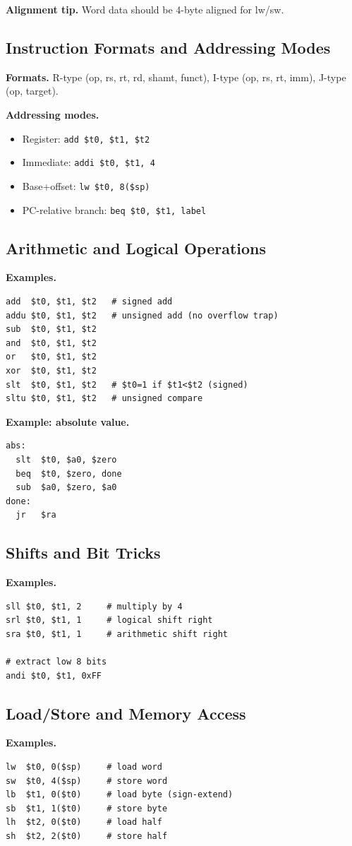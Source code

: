 \documentclass[11pt]{article}
\begin{document}
\textbf{Alignment tip.} Word data should be 4-byte aligned for lw/sw.

\subsection{Instruction Formats and Addressing Modes}
\textbf{Formats.} R-type (op, rs, rt, rd, shamt, funct), I-type (op, rs, rt, imm), J-type (op, target).

\textbf{Addressing modes.}
\begin{itemize}[leftmargin=*]
  \item Register: \texttt{add \$t0, \$t1, \$t2}
  \item Immediate: \texttt{addi \$t0, \$t1, 4}
  \item Base+offset: \texttt{lw \$t0, 8(\$sp)}
  \item PC-relative branch: \texttt{beq \$t0, \$t1, label}
\end{itemize}

\subsection{Arithmetic and Logical Operations}
\textbf{Examples.}
\begin{verbatim}
add  $t0, $t1, $t2   # signed add
addu $t0, $t1, $t2   # unsigned add (no overflow trap)
sub  $t0, $t1, $t2
and  $t0, $t1, $t2
or   $t0, $t1, $t2
xor  $t0, $t1, $t2
slt  $t0, $t1, $t2   # $t0=1 if $t1<$t2 (signed)
sltu $t0, $t1, $t2   # unsigned compare
\end{verbatim}

\textbf{Example: absolute value.}
\begin{verbatim}
abs:
  slt  $t0, $a0, $zero
  beq  $t0, $zero, done
  sub  $a0, $zero, $a0
done:
  jr   $ra
\end{verbatim}

\subsection{Shifts and Bit Tricks}
\textbf{Examples.}
\begin{verbatim}
sll $t0, $t1, 2     # multiply by 4
srl $t0, $t1, 1     # logical shift right
sra $t0, $t1, 1     # arithmetic shift right

# extract low 8 bits
andi $t0, $t1, 0xFF
\end{verbatim}

\subsection{Load/Store and Memory Access}
\textbf{Examples.}
\begin{verbatim}
lw  $t0, 0($sp)     # load word
sw  $t0, 4($sp)     # store word
lb  $t1, 0($t0)     # load byte (sign-extend)
sb  $t1, 1($t0)     # store byte
lh  $t2, 0($t0)     # load half
sh  $t2, 2($t0)     # store half
\end{verbatim}
\end{document}
